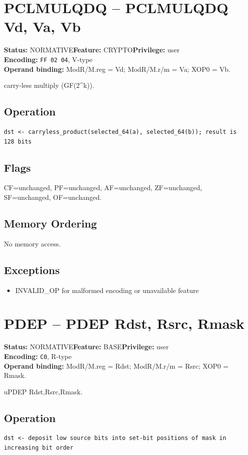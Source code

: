 \documentclass[10pt]{article}
\begin{document}
\section{PCLMULQDQ -- PCLMULQDQ Vd, Va, Vb}
\textbf{Status:} NORMATIVE\quad \textbf{Feature:} CRYPTO\quad \textbf{Privilege:} user\\
\textbf{Encoding:} \texttt{FF 02 04}, V-type\\
\textbf{Operand binding:} ModR/M.reg = Vd; ModR/M.r/m = Va; XOP0 = Vb.

carry-less multiply (GF(2\textasciicircum{}k)).

\subsection*{Operation}
\begin{lstlisting}
dst <- carryless_product(selected_64(a), selected_64(b)); result is 128 bits
\end{lstlisting}
\subsection*{Flags}
CF=unchanged, PF=unchanged, AF=unchanged, ZF=unchanged, SF=unchanged, OF=unchanged.
\subsection*{Memory Ordering}
No memory access.
\subsection*{Exceptions}
\begin{itemize}
\item INVALID\_OP for malformed encoding or unavailable feature
\end{itemize}
\clearpage

\section{PDEP -- PDEP Rdst, Rsrc, Rmask}
\textbf{Status:} NORMATIVE\quad \textbf{Feature:} BASE\quad \textbf{Privilege:} user\\
\textbf{Encoding:} \texttt{C0}, R-type\\
\textbf{Operand binding:} ModR/M.reg = Rdst; ModR/M.r/m = Rsrc; XOP0 = Rmask.

uPDEP Rdst,Rsrc,Rmask.

\subsection*{Operation}
\begin{lstlisting}
dst <- deposit low source bits into set-bit positions of mask in increasing bit order
\end{lstlisting}
\end{document}
